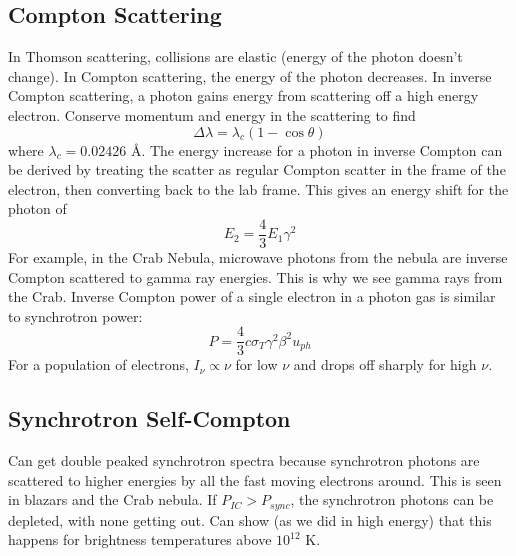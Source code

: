 \subsection{Compton Scattering}\label{sec:compton}
In Thomson scattering, collisions are elastic (energy of the photon doesn't change).  In Compton 
scattering, the energy of the photon decreases.  In inverse Compton scattering, a photon gains 
energy from scattering off a high energy electron.  Conserve momentum and energy in the 
scattering to find
\begin{displaymath}\Delta \lambda=\lambda_c(1-\cos{\theta})\end{displaymath}
where $\lambda_c=0.02426$ \AA.
The energy increase for a photon in inverse Compton can be derived by treating the scatter as 
regular Compton scatter in the frame of the electron, then converting back to the lab frame.  
This gives an energy shift for the photon of 
\begin{displaymath}E_2=\frac{4}{3}E_1\gamma^2\end{displaymath}
For example, in the Crab Nebula, microwave photons from the nebula are inverse Compton scattered 
to gamma ray energies.  This is why we see gamma rays from the Crab.  Inverse Compton power 
of a single electron in a photon gas is similar to synchrotron power:
\begin{displaymath}\boxed{P=\frac{4}{3}c\sigma_T\gamma^2\beta^2u_{ph}}\end{displaymath}
For a population of electrons, $I_{\nu}\propto \nu$ for low $\nu$ and drops off sharply for 
high $\nu$.

\subsection{Synchrotron Self-Compton}
Can get double peaked synchrotron spectra because synchrotron photons are scattered to higher 
energies by all the fast moving electrons around.  This is seen in blazars and the Crab nebula.  
If $P_{IC}>P_{sync}$, the synchrotron photons can be depleted, with none getting out.  Can show 
(as we did in high energy) that this happens for brightness temperatures above $10^{12}$ K.

